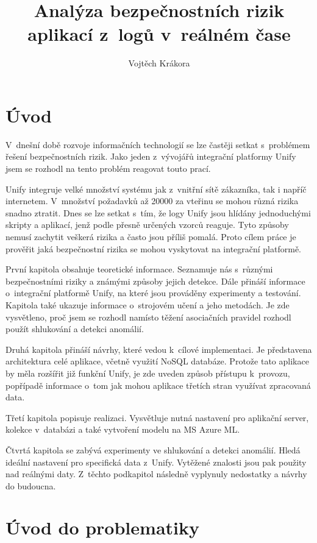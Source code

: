 \documentclass[thesis=M,czech]{FITthesis}[2012/10/20]
\title{Analýza bezpečnostních rizik aplikací z~logů v~reálném čase}
\author{Vojtěch Krákora} %
\begin{document}

\chapter{Úvod}
V~dnešní době rozvoje informačních technologií se lze častěji setkat s~problémem řešení bezpečnostních rizik. Jako jeden z~vývojářů integrační platformy Unify jsem se rozhodl na tento problém reagovat touto prací. 

Unify integruje velké množství systému jak z~vnitřní sítě zákazníka, tak i napříč internetem. V~množství požadavků až 20000 za vteřinu se mohou různá rizika snadno ztratit. Dnes se lze setkat s~tím, že logy Unify jsou hlídány jednoduchými skripty a aplikací, jenž podle přesně určených vzorců reaguje. Tyto způsoby nemusí zachytit veškerá rizika a často jsou příliš pomalá. Proto cílem práce je prověřit jaká bezpečnostní rizika se mohou vyskytovat na integrační platformě.

První kapitola obsahuje teoretické informace. Seznamuje nás s~různými bezpečnostními riziky a známými způsoby jejich detekce. Dále přináší informace o~integrační platformě Unify, na které jsou prováděny experimenty a testování. Kapitola také ukazuje informace o~strojovém učení a jeho metodách. Je zde vysvětleno, proč jsem se rozhodl namísto těžení asociačních pravidel   rozhodl použít shlukování a detekci anomálií.

Druhá kapitola přináší návrhy, které vedou k~cílové implementaci. Je představena architektura celé aplikace, včetně využití NoSQL databáze. Protože tato aplikace by měla rozšířit již funkční Unify, je zde uveden způsob přístupu k~provozu, popřípadě informace o~tom jak mohou aplikace třetích stran využívat zpracovaná data.

Třetí kapitola popisuje realizaci. Vysvětluje nutná nastavení pro aplikační server, kolekce v~databázi a také vytvoření modelu na MS Azure ML.

Čtvrtá kapitola se zabývá experimenty ve shlukování a detekci anomálií. Hledá ideální nastavení pro specifická data z~Unify. Vytěžené znalosti jsou pak použity nad reálnými daty. Z~těchto podkapitol následně vyplynuly nedostatky a návrhy do budoucna.
  


\chapter{Úvod do problematiky}
	
\end{document}
